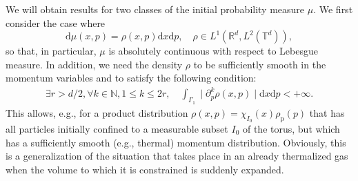 \documentclass{article}
\newcommand {\N}{\mathbb{N}}
\newcommand {\R}{\mathbb{R}}
\newcommand {\rd}{\mathrm{d}}
\newcommand {\T}{\mathbb{T}}
\numberwithin{equation}{section}
\begin{document}
We will obtain results for two classes of the initial probability measure $\mu$. We first consider the case where
\begin{equation}\label{eq:rhoconditions1}
\rd \mu(x,p)=\rho(x,p)\rd x\rd p,\quad \rho\in L^1(\R^d, L^2(\T^d)),
\end{equation}
so that, in particular, $\mu$ is absolutely continuous with respect to Lebesgue measure. In addition, we need the density $\rho$ to be
sufficiently smooth in the momentum variables and to satisfy the following condition:
\begin{eqnarray}\label{eq:rhoconditions}
\exists r > d/2, \forall k\in \N, 1\leq k\leq 2r,\quad
\int_{\Gamma_1}\mid \partial_p^{k}\rho(x,p)\mid\rd x\rd p<+\infty.
\end{eqnarray}
This allows, e.g., for a product distribution $\rho(x,p) = \chi_{I_0}(x)\rho_{{\mathrm p}}(p)$ that
has all particles initially confined to a measurable subset $I_0$ of the torus,
but which has a sufficiently smooth (e.g., thermal) momentum distribution. Obviously,
this is a generalization of the situation that takes place in an already thermalized
gas when the volume to which it is constrained is suddenly expanded.
\end{document}
